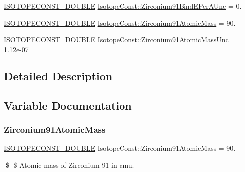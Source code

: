 \begin{DoxyCompactItemize}
\mbox{\hyperlink{group___isotope_const-_macros_ga8f45a7272ce02c0b4c65c44636ed719a}{I\+S\+O\+T\+O\+P\+E\+C\+O\+N\+S\+T\+\_\+\+D\+O\+U\+B\+LE}} \mbox{\hyperlink{group___isotope_const-_zirconium-_zr91_ga820c524e3ae94ef5cc054ab12f1c2c07}{Isotope\+Const\+::\+Zirconium91\+Bind\+E\+Per\+A\+Unc}} = 0.
\item 
\mbox{\hyperlink{group___isotope_const-_macros_ga8f45a7272ce02c0b4c65c44636ed719a}{I\+S\+O\+T\+O\+P\+E\+C\+O\+N\+S\+T\+\_\+\+D\+O\+U\+B\+LE}} \mbox{\hyperlink{group___isotope_const-_zirconium-_zr91_ga21571a8b508827bdea99b727907a38d5}{Isotope\+Const\+::\+Zirconium91\+Atomic\+Mass}} = 90.
\item 
\mbox{\hyperlink{group___isotope_const-_macros_ga8f45a7272ce02c0b4c65c44636ed719a}{I\+S\+O\+T\+O\+P\+E\+C\+O\+N\+S\+T\+\_\+\+D\+O\+U\+B\+LE}} \mbox{\hyperlink{group___isotope_const-_zirconium-_zr91_ga8272c95d4c90f18c5c35e076f46f9711}{Isotope\+Const\+::\+Zirconium91\+Atomic\+Mass\+Unc}} = 1.\+12e-\/07
\end{DoxyCompactItemize}


\subsection{Detailed Description}


\subsection{Variable Documentation}
\mbox{\label{group___isotope_const-_zirconium-_zr91_ga21571a8b508827bdea99b727907a38d5}} 
\subsubsection{\texorpdfstring{Zirconium91\+Atomic\+Mass}{Zirconium91AtomicMass}}
{\footnotesize\ttfamily \mbox{\hyperlink{group___isotope_const-_macros_ga8f45a7272ce02c0b4c65c44636ed719a}{I\+S\+O\+T\+O\+P\+E\+C\+O\+N\+S\+T\+\_\+\+D\+O\+U\+B\+LE}} Isotope\+Const\+::\+Zirconium91\+Atomic\+Mass = 90.}

\$ \$ Atomic mass of Zirconium-\/91 in amu. \mbox{\label{group___isotope_const-_zirconium-_zr91_ga8272c95d4c90f18c5c35e076f46f9711}} 
